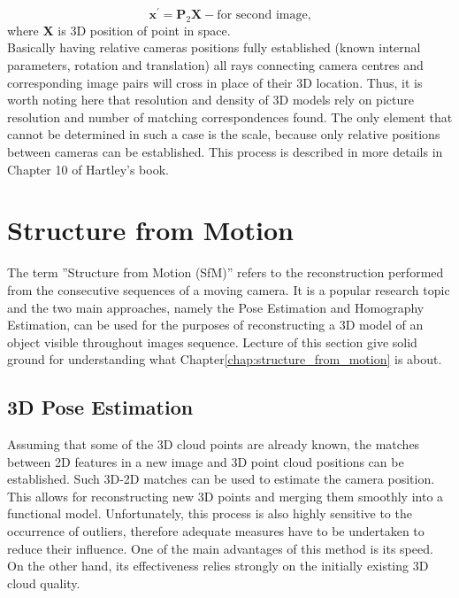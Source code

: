 \begin{equation}
 \textbf{x}^{'} = \textbf{P}_{2} \textbf{X} - \text{for second image,}
\end{equation}
where \textbf{X} is 3D position of point in space.
\\
Basically having relative cameras positions fully established (known internal parameters, rotation and translation) all rays connecting camera centres and corresponding image pairs will cross in place of their 3D location. Thus, it is worth noting here that resolution and density of 3D models rely on picture resolution and number of matching correspondences found. 
The only element that cannot be determined in such a case is the scale, because only relative positions between cameras can be established. This process is described in more details in Chapter 10 of Hartley's book\cite{HartleyMultipleView}.
\section{Structure from Motion}
The term ''Structure from Motion (SfM)'' refers to the reconstruction performed from the consecutive sequences of a moving camera. It is a popular research topic and the two main approaches, namely the Pose Estimation and Homography Estimation, can be used for the purposes of reconstructing a 3D model of an object visible throughout images sequence.
Lecture of this section give solid ground for understanding what Chapter\ref{chap:structure_from_motion} is about.
\subsection{3D Pose Estimation}
Assuming that some of the 3D cloud points are already known, the matches between 2D features in a new image and 3D point cloud positions can be established. Such 3D-2D matches can be used to estimate the camera position. This allows for reconstructing new 3D points and merging them smoothly into a functional model. Unfortunately,  this process is also highly sensitive to the occurrence of outliers, therefore adequate measures have to be undertaken to reduce their influence. One of the main advantages of this method is its speed. On the other hand, its effectiveness relies strongly on the initially existing 3D cloud quality. 
